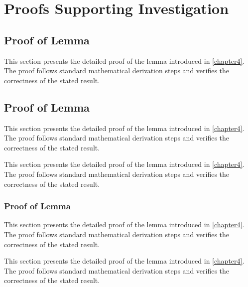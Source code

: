 \appendix
\chapter{Proofs Supporting Investigation}
\label{appendix}

\section{Proof of Lemma}
\begin{paragraph}
This section presents the detailed proof of the lemma introduced in \autoref{chapter4}. The proof follows standard mathematical derivation steps and verifies the correctness of the stated result.
\end{paragraph}

\section{Proof of Lemma}
\begin{paragraph}
This section presents the detailed proof of the lemma introduced in \autoref{chapter4}. The proof follows standard mathematical derivation steps and verifies the correctness of the stated result.

This section presents the detailed proof of the lemma introduced in \autoref{chapter4}. The proof follows standard mathematical derivation steps and verifies the correctness of the stated result.
\end{paragraph}

\subsection{Proof of Lemma}
\begin{subparagraph}
This section presents the detailed proof of the lemma introduced in \autoref{chapter4}. The proof follows standard mathematical derivation steps and verifies the correctness of the stated result.

This section presents the detailed proof of the lemma introduced in \autoref{chapter4}. The proof follows standard mathematical derivation steps and verifies the correctness of the stated result.
\end{subparagraph}

